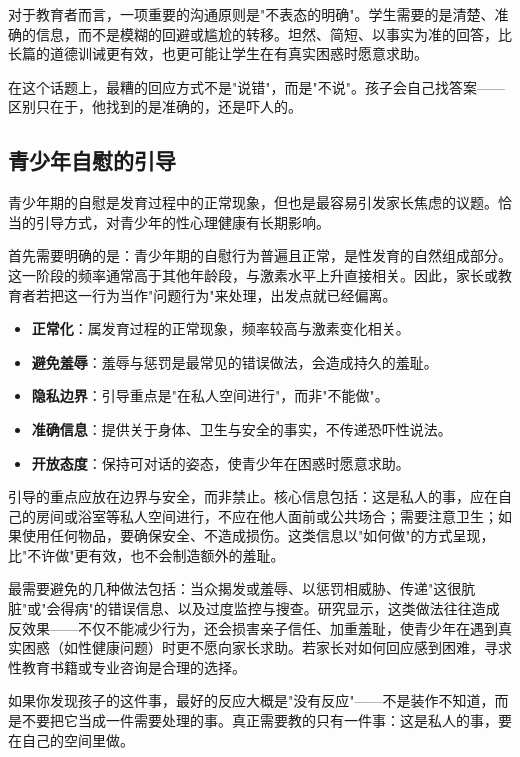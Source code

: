 \documentclass[12pt,UTF8]{ctexbook}
\newcommand{\keyword}[1]{\textbf{#1}}
\begin{document}
对于教育者而言，一项重要的沟通原则是"不表态的明确"。学生需要的是清楚、准确的信息，而不是模糊的回避或尴尬的转移。坦然、简短、以事实为准的回答，比长篇的道德训诫更有效，也更可能让学生在有真实困惑时愿意求助。

\begin{tcolorbox}[colback=pink!5!white,colframe=red!50!black,title=贴心小叮咛]
	在这个话题上，最糟的回应方式不是"说错"，而是"不说"。孩子会自己找答案——区别只在于，他找到的是准确的，还是吓人的。
\end{tcolorbox}
\subsection{青少年自慰的引导}

青少年期的自慰是发育过程中的正常现象，但也是最容易引发家长焦虑的议题。恰当的引导方式，对青少年的性心理健康有长期影响。

首先需要明确的是：青少年期的自慰行为普遍且正常，是性发育的自然组成部分。这一阶段的频率通常高于其他年龄段，与激素水平上升直接相关。因此，家长或教育者若把这一行为当作"问题行为"来处理，出发点就已经偏离。

\begin{itemize}
	\item \keyword{正常化}：属发育过程的正常现象，频率较高与激素变化相关。
	\item \keyword{避免羞辱}：羞辱与惩罚是最常见的错误做法，会造成持久的羞耻。
	\item \keyword{隐私边界}：引导重点是"在私人空间进行"，而非"不能做"。
	\item \keyword{准确信息}：提供关于身体、卫生与安全的事实，不传递恐吓性说法。
	\item \keyword{开放态度}：保持可对话的姿态，使青少年在困惑时愿意求助。
\end{itemize}

引导的重点应放在边界与安全，而非禁止。核心信息包括：这是私人的事，应在自己的房间或浴室等私人空间进行，不应在他人面前或公共场合；需要注意卫生；如果使用任何物品，要确保安全、不造成损伤。这类信息以"如何做"的方式呈现，比"不许做"更有效，也不会制造额外的羞耻。

最需要避免的几种做法包括：当众揭发或羞辱、以惩罚相威胁、传递"这很肮脏"或"会得病"的错误信息、以及过度监控与搜查。研究显示，这类做法往往造成反效果——不仅不能减少行为，还会损害亲子信任、加重羞耻，使青少年在遇到真实困惑（如性健康问题）时更不愿向家长求助。若家长对如何回应感到困难，寻求性教育书籍或专业咨询是合理的选择。

\begin{tcolorbox}[colback=pink!5!white,colframe=red!50!black,title=贴心小叮咛]
	如果你发现孩子的这件事，最好的反应大概是"没有反应"——不是装作不知道，而是不要把它当成一件需要处理的事。真正需要教的只有一件事：这是私人的事，要在自己的空间里做。
\end{tcolorbox}
\end{document}
